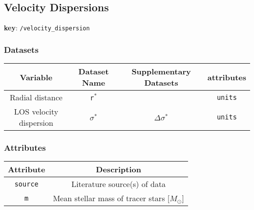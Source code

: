 \subsection{Velocity Dispersions}

\textbf{key}: \texttt{/velocity\_dispersion}

\subsubsection{Datasets}

\begin{center}
\begin{table}[H]
\begin{tabular}{ | c | c | c | c | }
    \hline
    Variable & Dataset Name & Supplementary Datasets &  attributes \\
    \hline\hline
    Radial distance & \texttt{r\(^*\)} & & \texttt{units} \\
    \hline
    LOS velocity dispersion & \texttt{\(\sigma^*\)} & \texttt{\(\Delta\sigma^*\)} &
    \texttt{units}\\
    \hline
\end{tabular}
\end{table}
\end{center}

\subsubsection{Attributes}


\begin{center}
\begin{table}[H]
\begin{tabular}{ | c | c | }
    \hline
    Attribute & Description \\
    \hline\hline
    \texttt{source} & Literature source(s) of data \\
    \hline
    \texttt{m} & Mean stellar mass of tracer stars [\(M_\odot\)] \\
    \hline
\end{tabular}
\end{table}
\end{center}
